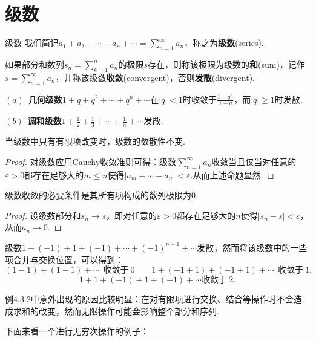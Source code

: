 \documentclass[lang=cn, zihao=5]{elegantbook}
\begin{document}
\section{级数}

\begin{definition}{级数}
	我们简记$a_1+a_2+\cdots +a_n + \cdots = \sum_{n=1}^{\infty} a_n$，称之为\textbf{级数}(series).
	
	如果部分和数列$s_n=\sum_{k=1}^n a_n$的极限$s$存在，则称该极限为级数的\textbf{和}(sum)，记作$s=\sum_{n=1}^{\infty} a_n$，并称该级数\textbf{收敛}(convergent)，否则\textbf{发散}(divergent).
\end{definition}

\begin{example}
	$(a)$~\textbf{几何级数}$1+q+q^2+\cdots +q^n+\cdots$在$|q|<1$时收敛于$\frac{1-q^n}{1-q}$，而$|q|\geq 1$时发散.
	
	$(b)$~\textbf{调和级数}$1+\frac{1}{2}+\frac{1}{3}+\cdots + \frac{1}{n} + \cdots$发散.
\end{example}

\begin{proposition}
	当级数中只有有限项改变时，级数的敛散性不变.
\end{proposition}
\begin{proof}
	对级数应用Cauchy收敛准则可得：级数$\sum_{n=1}^{\infty} a_n$收敛当且仅当对任意的$\varepsilon >0$都存在足够大的$m \leq n$使得$|a_m + \cdots + a_n|<\varepsilon$.从而上述命题显然.
\end{proof}

\begin{proposition}
	级数收敛的必要条件是其所有项构成的数列极限为$0$.
\end{proposition}
\begin{proof}
	设级数部分和$s_n \to s$，即对任意的$\varepsilon >0$都存在足够大的$n$使得$|s_n-s|<\varepsilon$，从而$a_n \to 0$.
\end{proof}

\begin{example}
	级数$1+(-1)+1+(-1)+\cdots +(-1)^{n+1}+\cdots$发散，然而将该级数中的一些项合并与交换位置，可以得到：
	$$(1-1)+(1-1)+\cdots ~~\textit{收敛于}~0 \qquad 1+(-1+1)+(-1+1)+\cdots ~~\textit{收敛于}~1.$$
	$$1+1+(-1)+1+(-1)+\cdots \textit{收敛于}~2.$$
\end{example}

例4.3.2中意外出现的原因比较明显：在对有限项进行交换、结合等操作时不会造成求和的改变，然而无限操作可能会影响整个部分和序列.

下面来看一个进行无穷次操作的例子：
\end{document}
